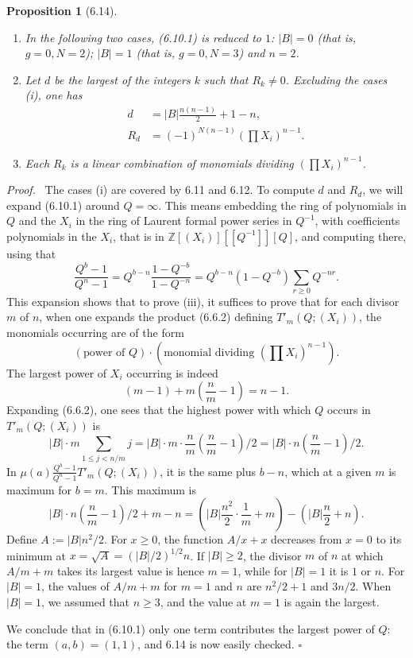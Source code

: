 \documentclass[10pt]{article}
\newcommand{\Z}{\mathbb Z}
\theoremstyle{deligne}
\newtheorem*{proposition*}{Proposition}
\newenvironment{proofdel}[1][Proof.]{\textit{#1}\ }{\hfill$\square$}
\begin{document}
\begin{proposition*}[6.14]
\begin{enumerate}[label=(\roman*)]
\item In the following two cases, (6.10.1) is reduced to $1$: $|B|=0$ (that is, $g=0,N=2$); $|B|=1$ (that is, $g=0,N=3$) and $n=2$.
\item Let $d$ be the largest of the integers $k$ such that $R_k\ne0$. Excluding the cases (i), one has
\begin{align}
d&=|B|\frac{n(n-1)}{2}+1-n,\tag{6.14.1}\\
R_d&=(-1)^{N(n-1)}\left(\prod X_i\right)^{n-1}.\tag{6.14.2}
\end{align}
\item Each $R_k$ is a linear combination of monomials dividing $\left(\prod X_i\right)^{n-1}$.
\end{enumerate}
\end{proposition*}

\begin{proofdel}
The cases (i) are covered by 6.11 and 6.12. To compute $d$ and $R_d$, we will expand (6.10.1) around $Q=\infty$. This means embedding the ring of polynomials in $Q$ and the $X_i$ in the ring of Laurent formal power series in $Q^{-1}$, with coefficients polynomials in the $X_i$, that is in $\Z[(X_i)][[Q^{-1}]][Q]$, and computing there, using that
\begin{equation}\tag{6.14.3}
\frac{Q^b-1}{Q^n-1}=Q^{b-n}\frac{1-Q^{-b}}{1-Q^{-n}}=Q^{b-n}(1-Q^{-b})\sum_{r\ge0}Q^{-nr}.
\end{equation}
This expansion shows that to prove (iii), it suffices to prove that for each divisor $m$ of $n$, when one expands the product (6.6.2) defining $T'_m(Q;(X_i))$, the monomials occurring are of the form
\[
(\text{power of }Q)\cdot\left(\text{monomial dividing }\left(\prod X_i\right)^{n-1}\right).
\]
The largest power of $X_i$ occurring is indeed
\[
(m-1)+m\left(\frac{n}{m}-1\right)=n-1.
\]
Expanding (6.6.2), one sees that the highest power with which $Q$ occurs in $T'_m(Q;(X_i))$ is
\[
|B|\cdot m\sum_{1\le j<n/m}j
=|B|\cdot m\cdot\frac{n}{m}\left(\frac{n}{m}-1\right)/2
=|B|\cdot n\left(\frac{n}{m}-1\right)/2.
\]
In $\mu(a)\frac{Q^b-1}{Q^n-1}T'_m(Q;(X_i))$, it is the same plus $b-n$, which at a given $m$ is maximum for $b=m$. This maximum is
\begin{equation}\tag{6.14.4}
|B|\cdot n\left(\frac{n}{m}-1\right)/2+m-n
=\left(|B|\frac{n^2}{2}\cdot\frac1m+m\right)-\left(|B|\frac n2+n\right).
\end{equation}
Define $A:=|B|n^2/2$. For $x\ge0$, the function $A/x+x$ decreases from $x=0$ to its minimum at $x=\sqrt A=(|B|/2)^{1/2}n$. If $|B|\ge2$, the divisor $m$ of $n$ at which $A/m+m$ takes its largest value is hence $m=1$, while for $|B|=1$ it is $1$ or $n$. For $|B|=1$, the values of $A/m+m$ for $m=1$ and $n$ are $n^2/2+1$ and $3n/2$. When $|B|=1$, we assumed that $n\ge3$, and the value at $m=1$ is again the largest.

We conclude that in (6.10.1) only one term contributes the largest power of $Q$: the term $(a,b)=(1,1)$, and 6.14 is now easily checked.
\end{proofdel}
\end{document}
